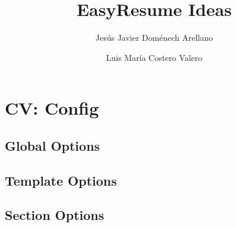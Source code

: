 \documentclass{article}
\begin{document}
\title{EasyResume Ideas}

\author{Jes\'us Javier Dom\'enech Arellano \and Luis Mar\'ia Costero Valero}

\maketitle 


\section{CV: Config}
\subsection{Global Options}

\subsection{Template Options}

\subsection{Section Options}

\end{document}
